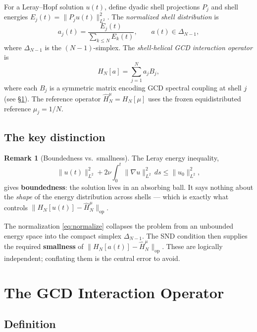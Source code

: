 \documentclass[12pt]{amsart}
\theoremstyle{definition}
\newtheorem{remark}[theorem]{Remark}
\newcommand{\HN}{\widehat{H}_N^\mu}
\begin{document}
For a Leray--Hopf solution $u(t)$, define dyadic shell projections
$P_j$ and shell energies $E_j(t)=\|P_j u(t)\|_{L^2}^2$.
The \emph{normalized shell distribution} is
\begin{equation}
\label{eq:normalize}
a_j(t) = \frac{E_j(t)}{\displaystyle\sum_{k\le N}E_k(t)},
\qquad a(t)\in\Delta_{N-1},
\end{equation}
where $\Delta_{N-1}$ is the $(N-1)$-simplex.
The \emph{shell-helical GCD interaction operator} is
\begin{equation}
\label{eq:HN}
H_N[a] = \sum_{j=1}^N a_j B_j,
\end{equation}
where each $B_j$ is a symmetric matrix encoding GCD spectral coupling
at shell $j$ (see \S\ref{sec:operator}).
The reference operator $\HN = H_N[\mu]$ uses the frozen equidistributed
reference $\mu_j = 1/N$.

\subsection{The key distinction}

\begin{remark}[Boundedness vs.\ smallness]
\label{rem:leray}
The Leray energy inequality,
\[
\|u(t)\|_{L^2}^2
+2\nu\!\int_0^t\!\|\nabla u\|_{L^2}^2\,ds
\le\|u_0\|_{L^2}^2,
\]
gives \textbf{boundedness}: the solution lives in an absorbing ball.
It says nothing about the \emph{shape} of the energy distribution
across shells — which is exactly what controls
$\|H_N[u(t)]-\HN\|_{\mathrm{op}}$.

The normalization \eqref{eq:normalize} collapses the problem from
an unbounded energy space into the compact simplex $\Delta_{N-1}$.
The SND condition then supplies the required \textbf{smallness}
of $\|H_N[a(t)]-\HN\|_{\mathrm{op}}$.
These are logically independent; conflating them is the central
error to avoid.
\end{remark}

\section{The GCD Interaction Operator}
\label{sec:operator}

\subsection{Definition}
\end{document}

